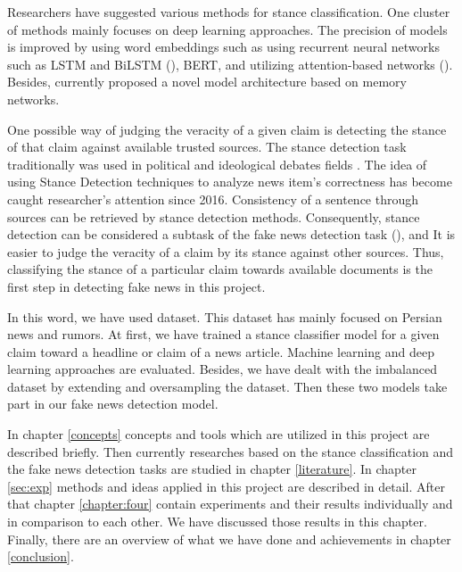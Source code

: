 Researchers have suggested various methods for stance classification. One cluster of methods mainly focuses on deep learning approaches. The precision of models is improved by using word embeddings such as using recurrent neural networks such as LSTM and BiLSTM (\cite{stanceCI}), \ac{BERT}, and utilizing attention-based networks (\cite{stanceCI}). Besides, \cite{memory_network} currently proposed a novel model architecture based on memory networks.

One possible way of judging the veracity of a given claim is detecting the stance of that claim against available trusted sources. The stance detection task traditionally was used in political and ideological debates fields \citep{stance_robust}. The idea of using Stance Detection techniques to analyze news item's correctness has become caught researcher's attention since 2016. Consistency of a sentence through sources can be retrieved by stance detection methods. Consequently, stance detection can be considered a subtask of the fake news detection task (\cite{book_datafake}), and It is easier to judge  the veracity of a claim by its stance against other sources. Thus, classifying the stance of a particular claim towards available documents is the first step in detecting fake news in this project. 

In this word, we have used \cite{stance_persian} dataset. This dataset has mainly focused on Persian news and rumors. At first, we have trained a stance classifier model for a given claim toward a headline or claim of a news article. Machine learning and deep learning approaches are evaluated. Besides, we have dealt with the imbalanced dataset by extending and oversampling the dataset. Then these two models take part in our fake news detection model.

In chapter \ref{concepts} concepts and tools which are utilized in this project are described briefly. Then currently researches based on the stance classification and the fake news detection tasks are studied in chapter \ref{literature}. In chapter \ref{sec:exp} methods and ideas applied in this project are described in detail. After that chapter \ref{chapter:four} contain experiments and their results individually and in comparison to each other. We have discussed those results in this chapter. Finally, there are an overview of what we have done and achievements in chapter \ref{conclusion}. 